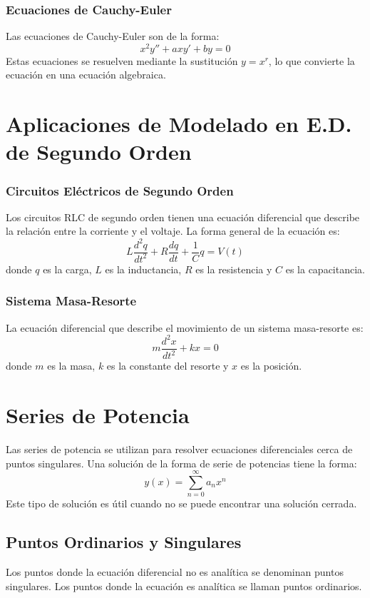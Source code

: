 \documentclass{article}
\begin{document}
\subsubsection{Ecuaciones de Cauchy-Euler}
Las ecuaciones de Cauchy-Euler son de la forma:
\[
x^2 y'' + axy' + by = 0
\]
Estas ecuaciones se resuelven mediante la sustitución \( y = x^r \), lo que convierte la ecuación en una ecuación algebraica.

\section{Aplicaciones de Modelado en E.D. de Segundo Orden}

\subsubsection{Circuitos Eléctricos de Segundo Orden}
Los circuitos RLC de segundo orden tienen una ecuación diferencial que describe la relación entre la corriente y el voltaje. La forma general de la ecuación es:
\[
L \frac{d^2q}{dt^2} + R \frac{dq}{dt} + \frac{1}{C} q = V(t)
\]
donde \( q \) es la carga, \( L \) es la inductancia, \( R \) es la resistencia y \( C \) es la capacitancia.

\subsubsection{Sistema Masa-Resorte}
La ecuación diferencial que describe el movimiento de un sistema masa-resorte es:
\[
m \frac{d^2x}{dt^2} + kx = 0
\]
donde \( m \) es la masa, \( k \) es la constante del resorte y \( x \) es la posición.

\section{Series de Potencia}

Las series de potencia se utilizan para resolver ecuaciones diferenciales cerca de puntos singulares. Una solución de la forma de serie de potencias tiene la forma:
\[
y(x) = \sum_{n=0}^{\infty} a_n x^n
\]
Este tipo de solución es útil cuando no se puede encontrar una solución cerrada.

\subsection{Puntos Ordinarios y Singulares}
Los puntos donde la ecuación diferencial no es analítica se denominan puntos singulares. Los puntos donde la ecuación es analítica se llaman puntos ordinarios.
\end{document}
